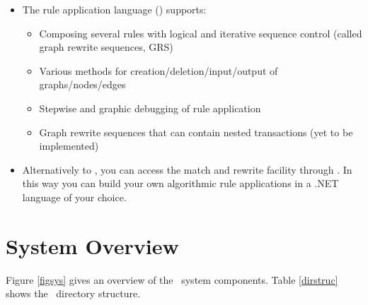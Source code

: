 \begin{itemize}
  \item The rule application language (\GrShell) supports:
  \begin{itemize}
    \item Composing several rules with logical and iterative sequence control (called graph rewrite sequences, GRS)
    \item Various methods for creation/deletion/input/output of graphs/nodes/edges 
    \item Stepwise and graphic debugging of rule application
    \item Graph rewrite sequences that can contain nested transactions (yet to be implemented)
  \end{itemize}
  
  \item Alternatively to \GrShell, you can access the match and rewrite facility through \LibGr. In this way you can build your own algorithmic rule applications in a .NET language of your choice. 
\end{itemize}


\section{System Overview}

Figure \ref{figsys} gives an overview of the \GrG\ system components. Table \ref{dirstruc} shows the \GrG\ directory structure.

